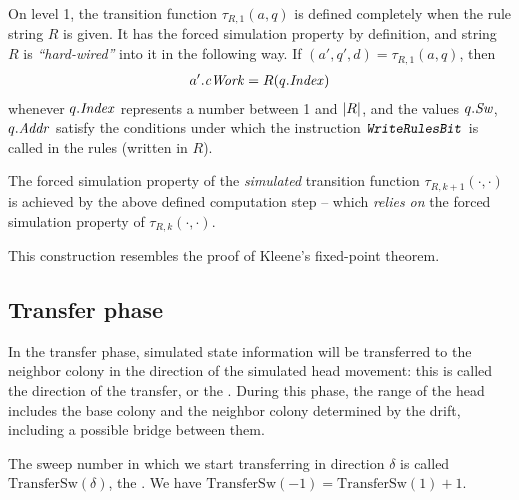 \documentclass[12pt]{memoir}
\newcommand{\fld}[1]{\ensuremath{\textit{#1\/}}}
\newcommand{\rul}[1]{\ensuremath{\texttt{\slshape #1\/}}}
\newcommand{\Addr}{\fld{Addr}}
\newcommand{\Index}{\fld{Index}}
\newcommand{\Sweep}{\fld{Sw}}
\newcommand{\cWork}{\fld{cWork}}
\newcommand{\TransferSw}{\mathrm{TransferSw}}
\newcommand{\WriteRulesBit}{\rul{WriteRulesBit}}
\begin{document}
\begin{itemize}
  \begin{sloppypar}
\item On level 1, the transition function \( \tau_{R,1}(a,q) \) is defined completely
when the rule string \( R \) is given.
It has the forced simulation property by definition, and
string \( R \) is \emph{``hard-wired''} into it in the following way.
If \( (a',q',d)=\tau_{R,1}(a,q) \), then
\begin{align*}
  a'.\cWork=R(q.\Index)
\end{align*}
whenever \( q.\Index \) represents a number between 1 and \( \lvert R \rvert \),
and the values \( q.\Sweep \), \( q.\Addr \) satisfy the conditions
under which the instruction \( \WriteRulesBit \) is 
called in the rules (written in \( R \)).
      \end{sloppypar}

      \begin{sloppypar}
\item The forced simulation property of the \emph{simulated}
transition function \( \tau_{R,k+1}(\cdot,\cdot) \) is 
achieved by the above defined computation 
step -- which \emph{relies on} the forced simulation property of \( \tau_{R,k}(\cdot,\cdot) \).
              \end{sloppypar}
\end{itemize}

\begin{remark}
This construction resembles the proof of Kleene's fixed-point theorem.
\end{remark}



\subsection{Transfer phase}\label{sec:TransferPhase}

In the transfer phase, simulated state information will be transferred to the
neighbor colony in the direction of the simulated head movement: this is
called the direction of the transfer, or the .
During this phase, the range of the head
includes the base colony and the neighbor colony
determined by the drift, including a possible bridge between them.

\begin{sloppypar}
The sweep number in which we start transferring in direction \( \delta \) is called
\( \TransferSw(\delta) \), the .
We have \( \TransferSw(-1) =\TransferSw(1)+1 \).  
\end{sloppypar}
\end{document}
